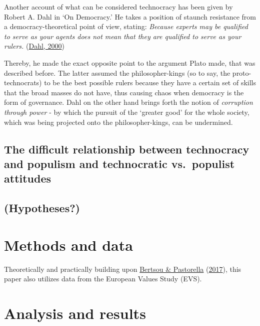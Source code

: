 \documentclass[
  12pt,
  english,
]{article}
\begin{document}
Another account of what can be considered technocracy has been given by
Robert A. Dahl in `On Democracy.' He takes a position of staunch
resistance from a democracy-theoretical point of view, stating:
\emph{Because experts may be qualified to serve as your agents does not
mean that they are qualified to serve as your rulers.}
(\protect\hyperlink{ref-dahl_onDemocracy}{Dahl, 2000})

Thereby, he made the exact opposite point to the argument Plato made,
that was described before. The latter assumed the philosopher-kings (so
to say, the proto-technocrats) to be the best possible rulers because
they have a certain set of skills that the broad masses do not have,
thus causing chaos when democracy is the form of governance. Dahl on the
other hand brings forth the notion of \emph{corruption through power} -
by which the pursuit of the `greater good' for the whole society, which
was being projected onto the philosopher-kings, can be undermined.

\hypertarget{the-difficult-relationship-between-technocracy-and-populism-and-technocratic-vs.-populist-attitudes}{%
\subsection{The difficult relationship between technocracy and populism
and technocratic vs.~populist
attitudes}\label{the-difficult-relationship-between-technocracy-and-populism-and-technocratic-vs.-populist-attitudes}}

\hypertarget{hypotheses}{%
\subsection{(Hypotheses?)}\label{hypotheses}}

\hypertarget{methods-and-data}{%
\section{Methods and data}\label{methods-and-data}}

Theoretically and practically building upon
\protect\hyperlink{ref-bertsou2017technocratic}{Bertsou \& Pastorella}
(\protect\hyperlink{ref-bertsou2017technocratic}{2017}), this paper also
utilizes data from the European Values Study (EVS).

\hypertarget{analysis-and-results}{%
\section{Analysis and results}\label{analysis-and-results}}
\end{document}
